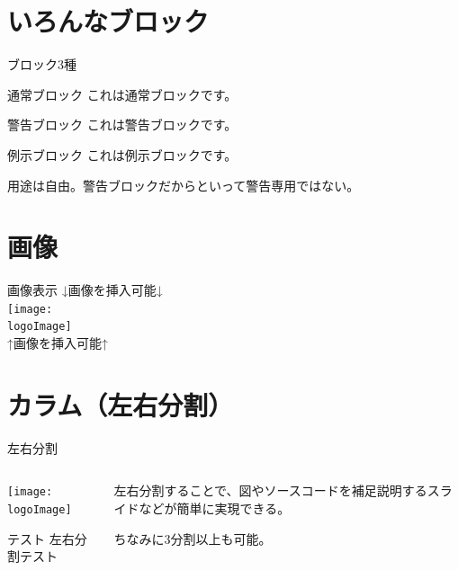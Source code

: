 \documentclass[
    aspectratio=169,   %
    xcolor={           %
        rgb,           %
        svgnames},     %
    unicode,           %
    12pt,              %
    unknownkeysallowed %
]{beamer}
\renewcommand{\logoImage}{png/SATORI.png}
\begin{document}
\section{いろんなブロック}

\begin{frame}[fragile]{ブロック3種}
  \begin{block}{通常ブロック}
    これは通常ブロックです。
  \end{block}

  \begin{alertblock}{警告ブロック}
    これは警告ブロックです。
  \end{alertblock}

  \begin{exampleblock}{例示ブロック}
    これは例示ブロックです。
  \end{exampleblock}
  用途は自由。警告ブロックだからといって警告専用ではない。
\end{frame}

\section{画像}

\begin{frame}[fragile]{画像表示}
  ↓画像を挿入可能↓\\
  \centering
  \texttt{[image: \\logoImage]}\\
  ↑画像を挿入可能↑
\end{frame}

\section{カラム（左右分割）}

\begin{frame}[fragile]{左右分割}
  \begin{columns}[c, onlytextwidth]
    \begin{column}{.4\textwidth}
      \centering
      \texttt{[image: \\logoImage]}
      \begin{block}{テスト}
        左右分割テスト
      \end{block}
    \end{column}
    \begin{column}{.55\textwidth}
      左右分割することで、図やソースコードを補足説明するスライドなどが簡単に実現できる。\par
      ちなみに3分割以上も可能。
    \end{column}
  \end{columns}
\end{frame}
\end{document}
